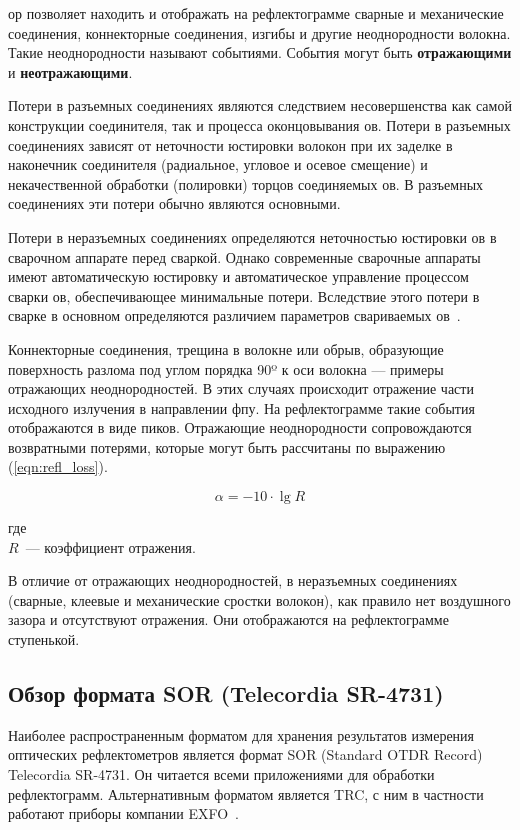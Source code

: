 \acrshort{ор} позволяет находить и отображать на рефлектограмме сварные и механические соединения, коннекторные соединения, изгибы и другие неоднородности волокна. Такие неоднородности называют событиями. 
События могут быть \textbf{отражающими} и \textbf{неотражающими}. 

Потери в разъемных соединениях являются следствием несовершенства как самой конструкции соединителя, так и процесса оконцовывания \acrshort{ов}. Потери в разъемных соединениях зависят от неточности юстировки волокон при их заделке в наконечник соединителя (радиальное, угловое и осевое смещение) и некачественной обработки (полировки) торцов соединяемых \acrshort{ов}. В разъемных соединениях эти потери обычно являются основными.

Потери в неразъемных соединениях определяются неточностью
юстировки \acrshort{ов} в сварочном аппарате перед сваркой. Однако современные сварочные аппараты имеют автоматическую юстировку и автоматическое управление процессом сварки \acrshort{ов}, обеспечивающее минимальные потери. Вследствие этого потери в сварке в основном определяются различием параметров свариваемых \acrshort{ов}~\cite{bilina:izmerenie_parametrov}.

Коннекторные соединения, трещина в волокне или обрыв, образующие поверхность разлома под углом порядка 90º к оси волокна --- примеры отражающих неоднородностей. В этих случаях происходит отражение части исходного излучения в направлении \acrshort{фпу}. На рефлектограмме такие события отображаются в виде пиков. 
Отражающие неоднородности сопровождаются возвратными потерями, которые могут быть рассчитаны по выражению (\ref{eqn:refl_loss}).

\begin{equation}
  \label{eqn:refl_loss}
  \alpha=-10\cdot \lg R
\end{equation}

\noindent где \\
$R$~--- коэффициент отражения.

В отличие от отражающих неоднородностей, в неразъемных соединениях (сварные, клеевые и механические сростки волокон), как правило нет воздушного зазора и отсутствуют отражения. Они отображаются на рефлектограмме ступенькой.

\subsection{Обзор формата SOR (Telecordia SR-4731)}

Наиболее распространенным форматом для хранения результатов измерения оптических рефлектометров является формат SOR (Standard OTDR Record) Telecordia SR-4731.
Он читается всеми приложениями для обработки рефлектограмм. Альтернативным форматом является TRC, с ним в частности работают приборы компании EXFO~\cite{web:volsexpert_reflectometria}.

